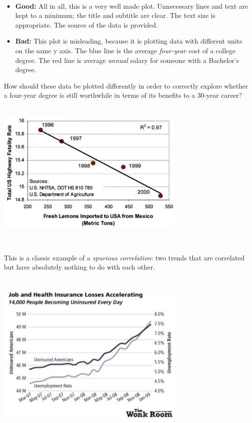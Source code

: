 \documentclass[]{book}
\begin{document}
~

\begin{itemize}
\item
  \textbf{Good:} All in all, this is a very well made plot. Unnecessary lines and text are kept to a minimum; the title and subtitle are clear. The text size is appropriate. The source of the data is provided.
\item
  \textbf{Bad:} This plot is misleading, because it is plotting data with different units on the same y axis. The blue line is the average \emph{four-year} cost of a college degree. The red line is average \emph{annual} salary for someone with a Bachelor's degree.
\end{itemize}

How should these data be plotted differently in order to correctly explore whether a four-year degree is still worthwhile in terms of its benefits to a 30-year career?

~\\

\includegraphics[width=0.7\textwidth,height=\textheight]{img/vis20.png}

~

This is a classic example of a \emph{spurious correlation}: two trends that are correlated but have absolutely nothing to do with each other.

~\\

\includegraphics[width=0.7\textwidth,height=\textheight]{img/vis21.png}
\end{document}
